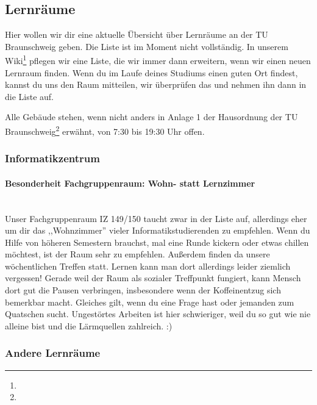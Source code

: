 
\subsection{Lernräume}


Hier wollen wir dir eine aktuelle Übersicht über Lernräume an der TU Braunschweig geben. Die Liste ist im Moment nicht vollständig. In unserem Wiki\footnote{} pflegen wir eine Liste, die wir immer dann erweitern, wenn wir einen neuen Lernraum finden. Wenn du im Laufe deines Studiums einen guten Ort findest, kannst du uns den Raum mitteilen, wir überprüfen das und nehmen ihn dann in die Liste auf.

Alle Gebäude stehen, wenn nicht anders in Anlage 1 der Hausordnung der TU Braunschweig\footnote{} erwähnt, von 7:30 bis 19:30 Uhr offen.

\subsubsection*{Informatikzentrum}



\paragraph{Besonderheit Fachgruppenraum: Wohn- statt Lernzimmer}\ \\
Unser Fachgruppenraum IZ 149/150 taucht zwar in der Liste auf, allerdings eher um dir das  ,,Wohnzimmer'' vieler Informatikstudierenden  zu empfehlen. Wenn du  Hilfe von höheren Semestern brauchst, mal eine Runde kickern oder etwas chillen möchtest, ist der Raum sehr zu empfehlen. Außerdem finden da unsere wöchentlichen Treffen statt. Lernen kann man dort allerdings leider ziemlich vergessen! Gerade weil der Raum als sozialer Treffpunkt fungiert, kann Mensch dort gut die Pausen verbringen, insbesondere wenn der Koffeinentzug sich bemerkbar macht. Gleiches gilt, wenn du eine Frage hast oder jemanden zum Quatschen sucht. Ungestörtes Arbeiten ist hier schwieriger, weil du so gut wie nie alleine bist und die Lärmquellen zahlreich. :)

\subsubsection*{Andere Lernräume}


